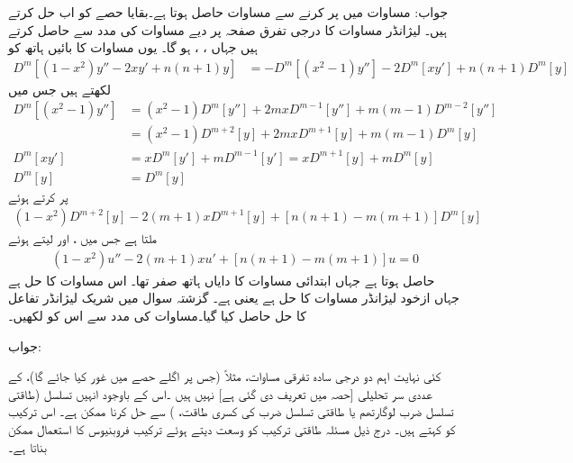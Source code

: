 جواب: مساوات  میں  پر کرنے سے  مساوات  حاصل ہوتا ہے۔بقایا حصے کو اب حل کرتے ہیں۔
لیژانڈر مساوات  کا  درجی تفرق صفحہ  پر دیے مساوات  کی مدد سے حاصل کرتے ہیں جہاں ،  ،   ہو گا۔ یوں مساوات کا بائیں ہاتھ کو
\begin{align*}
D^m[(1-x^2)y''-2xy'+n(n+1)y]&=-D^m[(x^2-1)y'']-2D^m[xy']+n(n+1)D^m[y]
\end{align*}
لکھتے ہیں جس میں
\begin{align*}
D^m[(x^2-1)y'']&=(x^2-1)D^m[y'']+2mxD^{m-1}[y'']+m(m-1)D^{m-2}[y'']\\
&=(x^2-1)D^{m+2}[y]+2mxD^{m+1}[y]+m(m-1)D^m[y]\\
D^m[xy']&=xD^m[y']+mD^{m-1}[y']=xD^{m+1}[y]+mD^m[y]\\
D^m[y]&=D^m[y]
\end{align*}
پر کرتے ہوئے 
\begin{align*}
(1-x^2)D^{m+2}[y]-2(m+1)xD^{m+1}[y]+[n(n+1)-m(m+1)]D^m[y]
\end{align*}
ملتا ہے جس میں ،  اور  لیتے ہوئے  
\begin{align*}
(1-x^2)u''-2(m+1)xu'+[n(n+1)-m(m+1)]u=0
\end{align*}
حاصل ہوتا ہے جہاں ابتدائی مساوات کا دایاں ہاتھ صفر تھا۔ اس مساوات کا حل  ہے جہاں  ازخود لیژانڈر مساوات کا حل ہے یعنی  ہے۔ 
گزشتہ سوال میں شریک لیژانڈر تفاعل کا حل  حاصل کیا گیا۔مساوات  کی مدد سے اس کو لکھیں۔ 

جواب:

کئی نہایت اہم دو درجی سادہ تفرقی مساوات، مثلاً  (جس پر اگلے حصے میں غور کیا جائے گا)، کے عددی سر تحلیلی [حصہ  میں تعریف دی گئی ہے] نہیں ہیں ۔اس کے باوجود انہیں تسلسل (طاقتی تسلسل ضرب لوگارتھم یا طاقتی تسلسل ضرب  کی کسری طاقت، ) سے حل کرنا ممکن ہے۔ اس ترکیب کو  کہتے ہیں۔ درج ذیل مسئلہ طاقتی ترکیب کو وسعت دیتے ہوئے ترکیب فروبنیوس کا استعمال ممکن بناتا ہے۔


